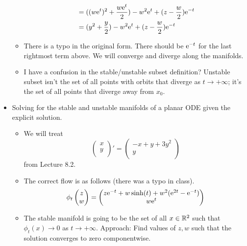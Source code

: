 \documentclass[../notes.tex]{subfiles}
\begin{document}
\begin{itemize}
\begin{itemize}
\begin{align*}
            &= ((w\e[t])^2+\frac{w\e[t]}{2})-w^2\e[t]+(z-\frac{w}{2})\e[-t]\\
            &= (y^2+\frac{y}{2})-w^2\e[t]+(z-\frac{w}{2})\e[-t]
        \end{align*}
        \item There is a typo in the original form. There should be $\e[-t]$ for the last rightmost term above. We will converge and diverge along the manifolds.
        \item I have a confusion in the stable/unstable subset definition? Unstable subset isn't the set of all points with orbits that diverge as $t\to +\infty$; it's the set of all points that diverge away from $x_0$.
    \end{itemize}
    \item Solving for the stable and unstable manifolds of a planar ODE given the explicit solution.
    \begin{itemize}
        \item We will treat
        \begin{equation*}
            \begin{pmatrix}
                x\\
                y\\
            \end{pmatrix}'
            =
            \begin{pmatrix}
                -x+y+3y^2\\
                y\\
            \end{pmatrix}
        \end{equation*}
        from Lecture 8.2.
        \item The correct flow is as follows (there was a typo in class).
        \begin{equation*}
            \phi_t
            \begin{pmatrix}
                z\\
                w\\
            \end{pmatrix}
            =
            \begin{pmatrix}
                z\e[-t]+w\sinh(t)+w^2(\e[2t]-\e[-t])\\
                w\e[t]\\
            \end{pmatrix}
        \end{equation*}
        \item The stable manifold is going to be the set of all $x\in\R^2$ such that $\phi_t(x)\to 0$ as $t\to +\infty$. Approach: Find values of $z,w$ such that the solution converges to zero componentwise.

\end{itemize}
\end{itemize}
\end{document}

